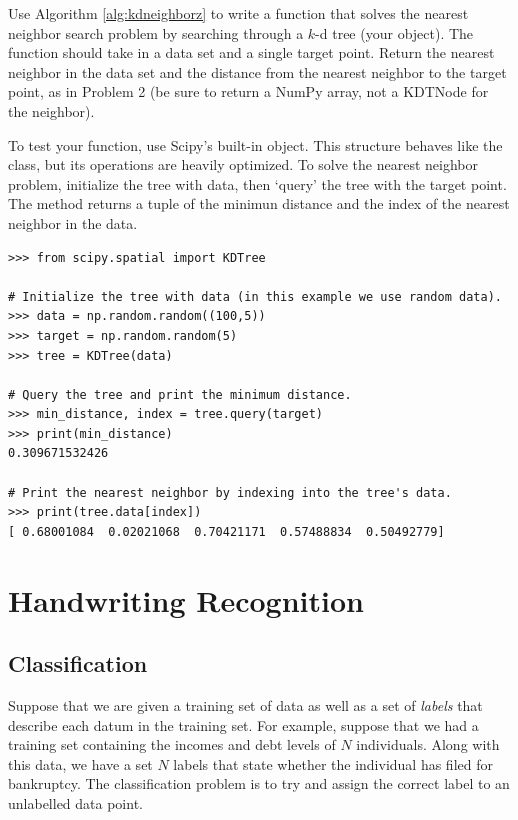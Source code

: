 \begin{problem} %
Use Algorithm \ref{alg:kdneighborz} to write a function that solves the nearest neighbor search problem by searching through a $k$-d tree (your  object).
The function should take in a data set and a single target point.
Return the nearest neighbor in the data set and the distance from the nearest neighbor to the target point, as in Problem 2 (be sure to return a NumPy array, not a KDTNode for the neighbor).

To test your function, use Scipy's built-in  object.
This structure behaves like the  class, but its operations are heavily optimized.
To solve the nearest neighbor problem, initialize the tree with data, then `query' the tree with the target point.
The  method returns a tuple of the minimun distance and the index of the nearest neighbor in the data.

\begin{lstlisting}
>>> from scipy.spatial import KDTree

# Initialize the tree with data (in this example we use random data).
>>> data = np.random.random((100,5))
>>> target = np.random.random(5)
>>> tree = KDTree(data)

# Query the tree and print the minimum distance.
>>> min_distance, index = tree.query(target)
>>> print(min_distance)
0.309671532426

# Print the nearest neighbor by indexing into the tree's data.
>>> print(tree.data[index])
[ 0.68001084  0.02021068  0.70421171  0.57488834  0.50492779]
\end{lstlisting}
\end{problem}

\section*{Handwriting Recognition} %

\subsection*{Classification} %

Suppose that we are given a training set of data as well as a set of \emph{labels} that describe each datum in the training set.
For example, suppose that we had a training set containing the incomes and debt levels of $N$ individuals.
Along with this data, we have a set $N$ labels that state whether the individual has filed for bankruptcy.
The classification problem is to try and assign the correct label to an unlabelled data point.

